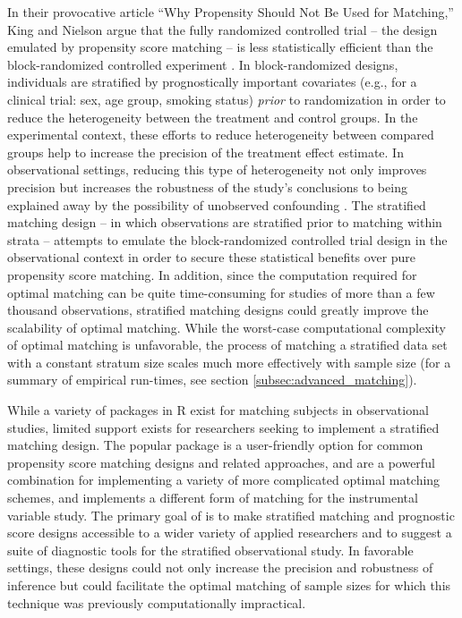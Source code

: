 In their provocative article ``Why Propensity Should Not Be Used for Matching,'' King and Nielson argue that the fully randomized controlled trial -- the design emulated by propensity score matching -- is less statistically efficient than the block-randomized controlled experiment \citep{king2019propensity}. In block-randomized designs, individuals are stratified by prognostically important covariates (e.g., for a clinical trial: sex, age group, smoking status) \textit{prior} to randomization in order to reduce the heterogeneity between the treatment and control groups.  In the experimental context, these efforts to reduce heterogeneity between compared groups help to increase the precision of the treatment effect estimate. In observational settings, reducing this type of heterogeneity not only improves precision but increases the robustness of the study's conclusions to being explained away by the possibility of unobserved confounding \citep{rosenbaum2005heterogeneity, aikens2020pilot}.  The stratified matching design -- in which observations are stratified prior to matching within strata -- attempts to emulate the block-randomized controlled trial design in the observational context in order to secure these statistical benefits over pure propensity score matching. In addition, since the computation required for optimal matching can be quite time-consuming for studies of more than a few thousand observations, stratified matching designs could greatly improve the scalability of optimal matching.  While the worst-case computational complexity of optimal matching is unfavorable, the process of matching a stratified data set with a constant stratum size scales much more effectively with sample size (for a summary of empirical run-times, see section \ref{subsec:advanced_matching}).

While a variety of packages in R \citep{RTeam2019R} exist for matching subjects in observational studies, limited support exists for researchers seeking to implement a stratified matching design.  The popular  package \citep{ho2011matchit} is a user-friendly option for common propensity score matching designs and related approaches,  \citep{hansen2006optmatch} and  \citep{rosenbaum2019DOS2} are a powerful combination for implementing a variety of more complicated optimal matching schemes, and  \citep{rigdon2018nearfar} implements a different form of matching for the instrumental variable study. The primary goal of  is to make stratified matching and prognostic score designs accessible to a wider variety of applied researchers and to suggest a suite of diagnostic tools for the stratified observational study. In favorable settings, these designs could not only increase the precision and robustness of inference but could facilitate the optimal matching of sample sizes for which this technique was previously computationally impractical. 

